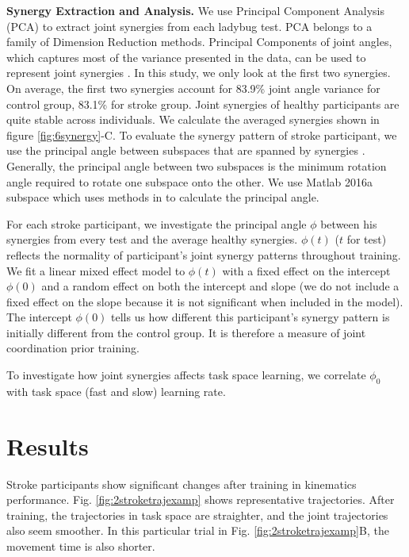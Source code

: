 \textbf{Synergy Extraction and Analysis.}
We use Principal Component Analysis (PCA) to extract joint synergies from each ladybug test.
PCA belongs to a family of Dimension Reduction methods.
Principal Components of joint angles, which captures most of the variance presented in the data, can be used to represent joint synergies \cite{}.
In this study, we only look at the first two synergies.
On average, the first two synergies account for 83.9\% joint angle variance for control group, 83.1\% for stroke group.
Joint synergies of healthy participants are quite stable across individuals.
We calculate the averaged synergies shown in figure \ref{fig:6synergy}-C.
To evaluate the synergy pattern of stroke participant, we use the principal angle \cite{} between subspaces that are spanned by synergies \cite{}.
Generally, the principal angle between two subspaces is the minimum rotation angle required to rotate one subspace onto the other.
We use Matlab 2016a \textsf{subspace} which uses methods in \cite{} to calculate the principal angle. 

For each stroke participant, we investigate the principal angle $ \phi $ between his synergies from every test and the average healthy synergies.
$ \phi(t) $ ($ t $ for test) reflects the normality of participant's joint synergy patterns throughout training. 
We fit a linear mixed effect model to $ \phi(t) $ with a fixed effect on the intercept $ \phi(0) $ and a random effect on both the intercept and slope (we do not include a fixed effect on the slope because it is not significant when included in the model).
The intercept $ \phi(0) $ tells us how different this participant's synergy pattern is initially different from the control group.
It is therefore a measure of joint coordination prior training.

To investigate how joint synergies affects task space learning, we correlate $ \phi_0 $ with task space (fast and slow) learning rate.

\section{Results}

Stroke participants show significant changes after training in kinematics performance.
Fig. \ref{fig:2stroketrajexamp} shows representative trajectories. After training, the trajectories in task space are straighter, and the joint trajectories also seem smoother. In this particular trial in Fig. \ref{fig:2stroketrajexamp}B, the movement time is also shorter.

